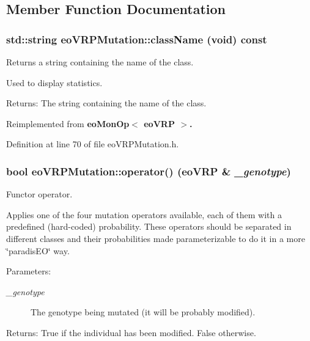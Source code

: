 \subsection{Member Function Documentation}
\subsubsection{\setlength{\rightskip}{0pt plus 5cm}std::string eo\-VRPMutation::class\-Name (void) const\hspace{0.3cm}{\tt  [inline, virtual]}}\label{classeo_v_r_p_mutation_1c99e21818d6bae1cdd21b4180601d41}


Returns a string containing the name of the class. 

Used to display statistics. \begin{Desc}
\item[Returns:]The string containing the name of the class. \end{Desc}


Reimplemented from \bf{eo\-Mon\-Op$<$ eo\-VRP $>$}.

Definition at line 70 of file eo\-VRPMutation.h.
\subsubsection{\setlength{\rightskip}{0pt plus 5cm}bool eo\-VRPMutation::operator() (\bf{eo\-VRP} \& {\em \_\-genotype})\hspace{0.3cm}{\tt  [inline, virtual]}}\label{classeo_v_r_p_mutation_f9fabdc8497f463add309fdace102813}


Functor operator. 

Applies one of the four mutation operators available, each of them with a predefined (hard-coded) probability. These operators should be separated in different classes and their probabilities made parameterizable to do it in a more \char`\"{}paradis\-EO\char`\"{} way. \begin{Desc}
\item[Parameters:]
\begin{description}
\item[{\em \_\-genotype}]The genotype being mutated (it will be probably modified). \end{description}
\end{Desc}
\begin{Desc}
\item[Returns:]True if the individual has been modified. False otherwise. \end{Desc}


